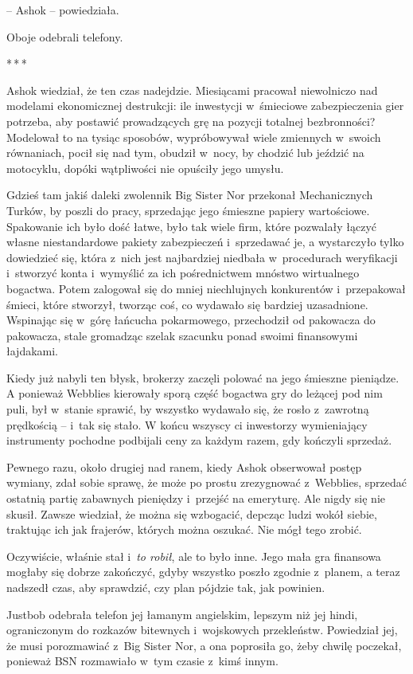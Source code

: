 \documentclass[oneside,polish,11pt,rmheadings]{mwbk}
\newcommand{\threeast}{\par\centerline{*\,*\,*}\medskip\par}
\begin{document}
-- Ashok -- powiedziała.

Oboje odebrali telefony.

\bigskip
\threeast

Ashok wiedział, że ten czas nadejdzie. Miesiącami pracował niewolniczo nad modelami ekonomicznej destrukcji: ile inwestycji w~śmieciowe zabezpieczenia gier potrzeba, aby postawić prowadzących grę na pozycji totalnej bezbronności? Modelował to na tysiąc sposobów, wypróbowywał wiele zmiennych w~swoich równaniach, pocił się nad tym, obudził w~nocy, by chodzić lub jeździć na motocyklu, dopóki wątpliwości nie opuściły jego umysłu.

Gdzieś tam jakiś daleki zwolennik Big Sister Nor przekonał Mechanicznych Turków, by poszli do pracy, sprzedając jego śmieszne papiery wartościowe. Spakowanie ich było dość łatwe, było tak wiele firm, które pozwalały łączyć własne niestandardowe pakiety zabezpieczeń i~sprzedawać je, a wystarczyło tylko dowiedzieć się, która z~nich jest najbardziej niedbała w~procedurach weryfikacji i~stworzyć konta i~wymyślić za ich pośrednictwem mnóstwo wirtualnego bogactwa. Potem zalogował się do mniej niechlujnych konkurentów i~przepakował śmieci, które stworzył, tworząc coś, co wydawało się bardziej uzasadnione. Wspinając się w~górę łańcucha pokarmowego, przechodził od pakowacza do pakowacza, stale gromadząc szelak szacunku ponad swoimi finansowymi łajdakami.

Kiedy już nabyli ten błysk, brokerzy zaczęli polować na jego śmieszne pieniądze. A ponieważ Webblies kierowały sporą część bogactwa gry do leżącej pod nim puli, był w~stanie sprawić, by wszystko wydawało się, że rosło z~zawrotną prędkością -- i~tak się stało. W końcu wszyscy ci inwestorzy wymieniający instrumenty pochodne podbijali ceny za każdym razem, gdy kończyli sprzedaż.

Pewnego razu, około drugiej nad ranem, kiedy Ashok obserwował postęp wymiany, zdał sobie sprawę, że może po prostu zrezygnować z~Webblies, sprzedać ostatnią partię zabawnych pieniędzy i~przejść na emeryturę. Ale nigdy się nie skusił. Zawsze wiedział, że można się wzbogacić, depcząc ludzi wokół siebie, traktując ich jak frajerów, których można oszukać. Nie mógł tego zrobić.

Oczywiście, właśnie stał i~\textit{to robił}, ale to było inne. Jego mała gra finansowa mogłaby się dobrze zakończyć, gdyby wszystko poszło zgodnie z~planem, a teraz nadszedł czas, aby sprawdzić, czy plan pójdzie tak, jak powinien.

Justbob odebrała telefon jej łamanym angielskim, lepszym niż jej hindi, ograniczonym do rozkazów bitewnych i~wojskowych przekleństw. Powiedział jej, że musi porozmawiać z~Big Sister Nor, a ona poprosiła go, żeby chwilę poczekał, ponieważ BSN rozmawiało w~tym czasie z~kimś innym.
\end{document}
